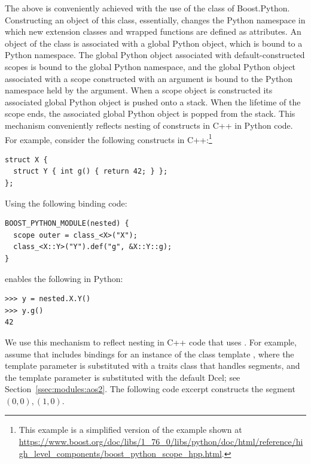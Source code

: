 The above is conveniently achieved with the use of the
 class of Boost.Python. Constructing an object
of this class, essentially, changes the Python namespace in which new
extension classes and wrapped functions are defined as attributes.  An
object of the  class is associated with a
global Python object, which is bound to a Python namespace. The global
Python object associated with default-constructed scopes is bound to
the global Python namespace, and the global Python object associated
with a scope constructed with an argument is bound to the Python
namespace held by the argument. When a scope object is constructed its
associated global Python object is pushed onto a stack. When the
lifetime of the scope ends, the associated global Python object is
popped from the stack. This mechanism conveniently reflects nesting of
constructs in C++ in Python code. For example, consider the following
constructs in C++:\footnote{This example is a simplified version of
  the example shown at
  \url{https://www.boost.org/doc/libs/1_76_0/libs/python/doc/html/reference/high_level_components/boost_python_scope_hpp.html}.}

\begin{lstlisting}[style=cppNumberedStyle]
struct X {
  struct Y { int g() { return 42; } };
};
\end{lstlisting}

\noindent
Using the following binding code:

\begin{lstlisting}[style=cppNumberedStyle]
BOOST_PYTHON_MODULE(nested) {
  scope outer = class_<X>("X");
  class_<X::Y>("Y").def("g", &X::Y::g);
}
\end{lstlisting}

\noindent
enables the following in Python:

\begin{lstlisting}[style=pythonStyle]
>>> y = nested.X.Y()
>>> y.g()
42
\end{lstlisting}

\noindent
We use this mechanism to reflect nesting in C++ code that uses \cgal.
For example, assume
that  includes bindings for an instance of the
class template ,
where the  template parameter is
substituted with a traits class that handles segments, and the
 template parameter is substituted with the default
Dcel; see Section~\ref{ssec:modules:aos2}. The following code excerpt
constructs the segment $(0,0),(1,0)$.

